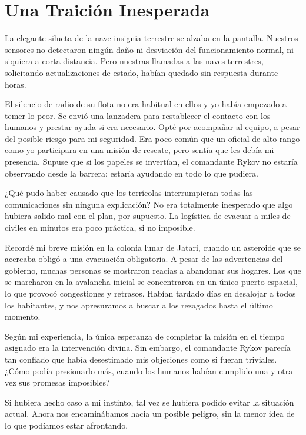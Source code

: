 \chapter{Una Traición Inesperada}

La elegante silueta de la nave insignia terrestre se alzaba en la pantalla. Nuestros sensores no detectaron ningún daño ni desviación del funcionamiento normal, ni siquiera a corta distancia. Pero nuestras llamadas a las naves terrestres, solicitando actualizaciones de estado, habían quedado sin respuesta durante horas.

El silencio de radio de su flota no era habitual en ellos y yo había empezado a temer lo peor. Se envió una lanzadera para restablecer el contacto con los humanos y prestar ayuda si era necesario. Opté por acompañar al equipo, a pesar del posible riesgo para mi seguridad. Era poco común que un oficial de alto rango como yo participara en una misión de rescate, pero sentía que les debía mi presencia. Supuse que si los papeles se invertían, el comandante Rykov no estaría observando desde la barrera; estaría ayudando en todo lo que pudiera.

¿Qué pudo haber causado que los terrícolas interrumpieran todas las comunicaciones sin ninguna explicación? No era totalmente inesperado que algo hubiera salido mal con el plan, por supuesto. La logística de evacuar a miles de civiles en minutos era poco práctica, si no imposible.

Recordé mi breve misión en la colonia lunar de Jatari, cuando un asteroide que se acercaba obligó a una evacuación obligatoria. A pesar de las advertencias del gobierno, muchas personas se mostraron reacias a abandonar sus hogares. Los que se marcharon en la avalancha inicial se concentraron en un único puerto espacial, lo que provocó congestiones y retrasos. Habían tardado días en desalojar a todos los habitantes, y nos apresuramos a buscar a los rezagados hasta el último momento.

Según mi experiencia, la única esperanza de completar la misión en el tiempo asignado era la intervención divina. Sin embargo, el comandante Rykov parecía tan confiado que había desestimado mis objeciones como si fueran triviales. ¿Cómo podía presionarlo más, cuando los humanos habían cumplido una y otra vez sus promesas imposibles?

Si hubiera hecho caso a mi instinto, tal vez se hubiera podido evitar la situación actual. Ahora nos encaminábamos hacia un posible peligro, sin la menor idea de lo que podíamos estar afrontando.

